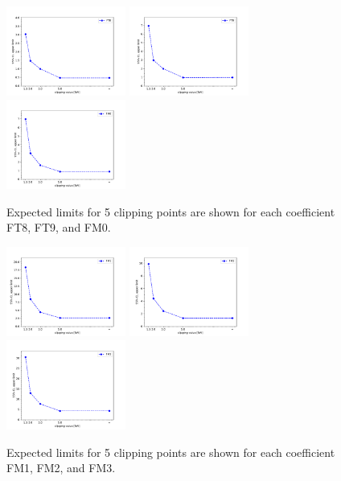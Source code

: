 \begin{figure}[ht]
    \centering
    	\includegraphics[width=0.35\textwidth]{figures/aQGC/ClippedFT8.pdf}
    	\includegraphics[width=0.35\textwidth]{figures/aQGC/ClippedFT9.pdf}
    	\includegraphics[width=0.35\textwidth]{figures/aQGC/ClippedFM0.pdf}
        \caption{Expected limits for 5 clipping points are shown for each coefficient FT8, FT9, and FM0.}
\end{figure}

\begin{figure}[ht]
    \centering
    	\includegraphics[width=0.35\textwidth]{figures/aQGC/ClippedFM1.pdf}
    	\includegraphics[width=0.35\textwidth]{figures/aQGC/ClippedFM2.pdf}
    	\includegraphics[width=0.35\textwidth]{figures/aQGC/ClippedFM3.pdf}
        \caption{Expected limits for 5 clipping points are shown for each coefficient FM1, FM2, and FM3.}
\end{figure}

